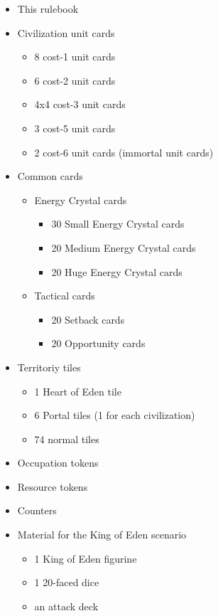 \documentclass[a4paper]{article}
\begin{document}
    \begin{itemize}
        \item This rulebook
        \item Civilization unit cards
            \begin{itemize}
                \item 8 cost-1 unit cards
                \item 6 cost-2 unit cards
                \item 4x4 cost-3 unit cards
                \item 3 cost-5 unit cards
                \item 2 cost-6 unit cards (immortal unit cards)
            \end{itemize}
        \item Common cards
            \begin{itemize}
                \item Energy Crystal cards
                    \begin{itemize}
                        \item 30 Small Energy Crystal cards
                        \item 20 Medium Energy Crystal cards
                        \item 20 Huge Energy Crystal cards
                    \end{itemize}
                \item Tactical cards
                    \begin{itemize}
                        \item 20 Setback cards
                        \item 20 Opportunity cards
                    \end{itemize}
            \end{itemize}
        \item Territoriy tiles
            \begin{itemize}
                \item 1 Heart of Eden tile
                \item 6 Portal tiles (1 for each civilization)
                \item 74 normal tiles
            \end{itemize}
        \item Occupation tokens
        \item Resource tokens
        \item Counters
        \item Material for the King of Eden scenario
            \begin{itemize}
                \item 1 King of Eden figurine
                \item 1 20-faced dice
                \item an attack deck
            \end{itemize}
    \end{itemize}
\end{document}
